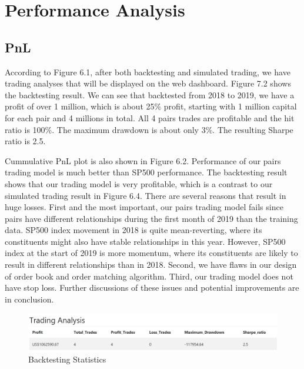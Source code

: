 \chapter{Performance Analysis}
\label{chap:performance analysis}

\section{PnL}
According to Figure 6.1, after both backtesting and simulated trading, we have trading analyses that will be displayed on the web dashboard. Figure 7.2 shows the backtesting result. We can see that backtested from 2018 to 2019, we have a profit of over 1 million, which is about 25\% profit, starting with 1 million capital for each pair and 4 millions in total. All 4 pairs trades are profitable and the hit ratio is 100\%. The maximum drawdown is about only 3\%. The resulting Sharpe ratio is 2.5.

Cummulative PnL plot is also shown in Figure 6.2. Performance of our pairs trading model is much better than SP500 performance. The backtesting result shows that our trading model is very profitable, which is a contrast to our simulated trading result in Figure 6.4. There are several reasons that result in huge losses. First and the most important, our pairs trading model fails since pairs have different relationships during the first month of 2019 than the training data. SP500 index movement in 2018 is quite mean-reverting, where its constituents might also have stable relationships in this year. However, SP500 index at the start of 2019 is more momentum, where its constituents are likely to result in different relationships than in 2018. Second, we have flaws in our design of order book and order matching algorithm. Third, our trading model does not have stop loss. Further discussions of these issues and potential improvements are in conclusion.

\begin{figure}[h!]
\centering
\includegraphics[scale=0.5]{performance_analysis/images/pnl1.png}
\caption{Backtesting Statistics}
\label{fig:backteststats}
\end{figure}

